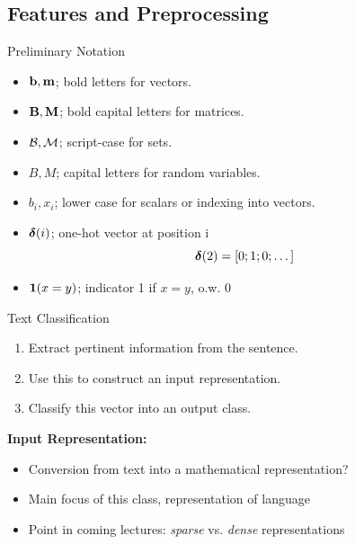 \documentclass{beamer}
\begin{document}
\subsection{Features and Preprocessing}

\begin{frame}{Preliminary Notation}
  \begin{itemize}
  \item $\mathbf{b}, \mathbf{m}$;  bold letters for vectors.
  \item $\mathbf{B}, \mathbf{M}$;  bold capital letters for matrices.
  \item $\mathcal{B}, \mathcal{M}$;  script-case for sets.
  \item $B, M$; capital letters for random variables.
  \item $b_i, x_i$; lower case for scalars or indexing into vectors.
  \end{itemize}


  \begin{itemize}
  \item $\boldsymbol{\delta}(i)$; one-hot vector at position i
    \[\boldsymbol{\delta}(2) = \left[ 0; 1; 0; \dots \right]\] 
  \item $\mathbf{1}(x = y)$; indicator 1 if $x = y$, o.w. 0

  \end{itemize}


\end{frame}


\begin{frame}{Text Classification}

  \begin{enumerate}
  \item Extract pertinent information from the sentence. 
    \air 

  \item Use this to construct an input representation.
    \air

  \item Classify this vector into an output class.
  \end{enumerate}

  \pause
  \air


  \textbf{Input Representation:}
  \begin{itemize}
  \item Conversion from  text into a mathematical representation?
  \item Main focus of this class, representation of language
  \item Point in coming lectures: \textit{sparse} vs. \textit{dense} representations
  \end{itemize}

\end{frame}
\end{document}
